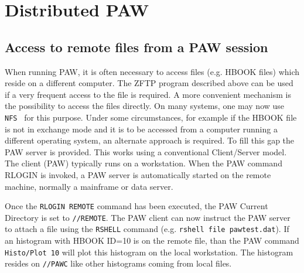 
\chapter{Distributed PAW}
\label{sec:H1DIST}
 
\section{Access to remote files from a PAW session}
 
When running PAW, it is often necessary to access files
(e.g. HBOOK files) which reside on a different computer. 
The ZFTP program described
above can be used if a very frequent access to the file is required. A
more convenient mechanism is the possibility to access the 
files directly. On many systems, one may now use \texttt{NFS}~\cite{bib-NFS}
for this purpose. Under some circumstances, for example if the HBOOK
file is not in exchange mode and it is to be accessed from a computer
running a different operating system, an alternate approach is required.
To fill this gap the PAW server is provided. This works using
a conventional Client/Server model. The client
(PAW) typically runs on a workstation. When the PAW command RLOGIN is invoked,
a PAW server is automatically started on the remote machine, normally
a mainframe or data server. 
 
Once the \texttt{RLOGIN REMOTE} command has been executed, the PAW Current Directory
is set to \texttt{//REMOTE}. The PAW client can now instruct the PAW server to
attach a file using the \texttt{RSHELL} command (e.g. \texttt{rshell file pawtest.dat}). If an
histogram with HBOOK ID=10 is on the remote file, than the PAW command
\texttt{Histo/Plot 10}
will plot this histogram on the local workstation. The histogram resides
on \texttt{//PAWC} like other histograms coming from local files.
 

